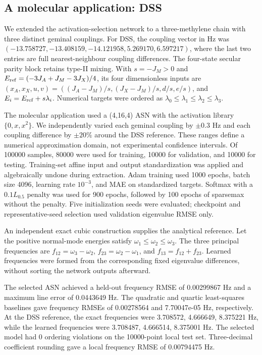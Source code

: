 \subsection{A molecular application: DSS}
We extended the activation-selection network to a three-methylene chain with
three distinct geminal couplings. For DSS, the coupling vector in Hz was
$(-13.758727,-13.408159,-14.121958,5.269170,6.597217)$, where the last two
entries are full nearest-neighbour coupling differences. The four-state
secular parity block retains type-II mixing. With $s=-J_M>0$ and
$E_{\rm ref}=(-3J_A+J_M-3J_X)/4$, its four dimensionless inputs are
$(x_A,x_X,u,v)=((J_A-J_M)/s,(J_X-J_M)/s,d/s,e/s)$, and
$E_i=E_{\rm ref}+s\lambda_i$. Numerical targets were ordered as
$\lambda_0\le\lambda_1\le\lambda_2\le\lambda_3$.

The molecular application used a (4,16,4) ASN with the activation library
$\{0,x,x^2\}$. We independently varied each geminal coupling by $\pm0.3$ Hz
and each coupling difference by $\pm20\%$ around the DSS reference. These
ranges define a numerical approximation domain, not experimental confidence
intervals. Of 100000 samples, 80000 were used for training, 10000 for
validation, and 10000 for testing. Training-set affine input and output
standardization was applied and algebraically undone during extraction.
Adam training used 1000 epochs, batch size 4096, learning rate $10^{-3}$,
and MAE on standardized targets. Softmax with a $0.1L_{0.5}$ penalty was
used for 900 epochs, followed by 100 epochs of sparsemax without the penalty.
Five initialization seeds were evaluated; checkpoint and representative-seed
selection used validation eigenvalue RMSE only.

An independent exact cubic construction supplies the analytical reference.
Let the positive normal-mode energies satisfy $\omega_1\le\omega_2\le\omega_3$.
The three principal frequencies are
$f_{12}=\omega_3-\omega_2$, $f_{23}=\omega_2-\omega_1$, and
$f_{13}=f_{12}+f_{23}$. Learned frequencies were formed from the corresponding
fixed eigenvalue differences, without sorting the network outputs afterward.

The selected ASN achieved a held-out frequency RMSE of 0.00299867 Hz and a maximum line error of 0.0443649 Hz. The quadratic and quartic least-squares baselines gave frequency RMSEs of 0.00278564 and 7.70047e-05 Hz, respectively. At the DSS reference, the exact frequencies were 3.708572, 4.666649, 8.375221 Hz, while the learned frequencies were 3.708487, 4.666514, 8.375001 Hz. The selected model had 0 ordering violations on the 10000-point local test set. Three-decimal coefficient rounding gave a local frequency RMSE of 0.00794475 Hz.


